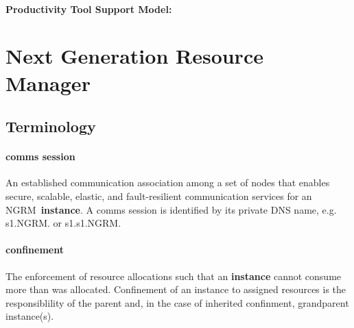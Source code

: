 \documentclass{article}
\newcommand{\ngrm}{NGRM}
\begin{document}
\paragraph{Productivity Tool Support Model:}

%
%
%
%
%
%

\section{Next Generation Resource Manager}
\subsection{Terminology}

\paragraph{comms session}
An established communication association among a set of nodes that
enables secure, scalable, elastic, and fault-resilient communication
services for an \ngrm\ {\bf instance}.
A comms session is identified by its private DNS name, e.g. s1.\ngrm.
or s1.s1.\ngrm.

\paragraph{confinement}
The enforcement of resource allocations such that an {\bf instance} cannot
consume more than was allocated.  Confinement of an instance to assigned
resources is the responsiblility of the parent and, in the case of inherited
confinment, grandparent instance(s).
\end{document}
